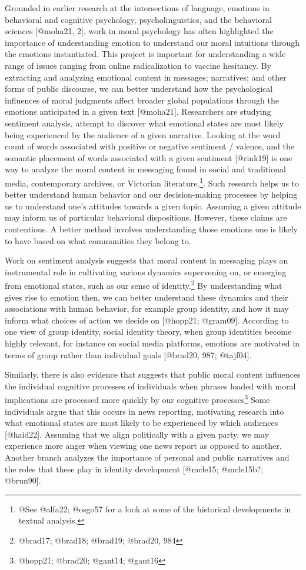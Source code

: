 \documentclass[
  letterpaper,
  DIV=11,
  numbers=noendperiod]{scrartcl}
\theoremstyle{remark}
\begin{document}
Grounded in earlier research at the intersections of language, emotions
in behavioral and cognitive psychology, psycholinguistics, and the
behavioral sciences {[}@moha21, 2{]}, work in moral psychology has often
highlighted the importance of understanding emotion to understand our
moral intuitions through the emotions instantiated. This project is
important for understanding a wide range of issues ranging from online
radicalization to vaccine hesitancy. By extracting and analyzing
emotional content in messages; narratives; and other forms of public
discourse, we can better understand how the psychological influences of
moral judgments affect broader global populations through the emotions
anticipated in a given text {[}@moha21{]}. Researchers are studying
sentiment analysis, attempt to discover what emotional states are most
likely being experienced by the audience of a given narrative. Looking
at the word count of words associated with positive or negative
sentiment / valence, and the semantic placement of words associated with
a given sentiment {[}@rink19{]} is one way to analyze the moral content
in messaging found in social and traditional media, contemporary
archives, or Victorian literature.\footnote{@See @alfa22; @osgo57 for a
  look at some of the historical developments in textual analysis.}.
Such research helps us to better understand human behavior and our
decision-making processes by helping us to understand one's attitudes
towards a given topic. Assuming a given attitude may inform us of
particular behavioral dispositions. However, these claims are
contentious. A better method involves understanding those emotions one
is likely to have based on what communities they belong to.

Work on sentiment analysis suggests that moral content in messaging
plays an instrumental role in cultivating various dynamics supervening
on, or emerging from emotional states, such as our sense of
identity.\footnote{@brad17; @brad18; @brad19; @brad20, 984} By
understanding what gives rise to emotion then, we can better understand
these dynamics and their associations with human behavior, for example
group identity, and how it may inform what choices of action we decide
on {[}@hopp21; @gram09{]}. According to one view of group identity,
social identity theory, when group identities become highly relevant,
for instance on social media platforms, emotions are motivated in terms
of group rather than individual goals {[}@brad20, 987; @tajf04{]}.

Similarly, there is also evidence that suggests that public moral
content influences the individual cognitive processes of individuals
when phrases loaded with moral implications are processed more quickly
by our cognitive processes\footnote{@hopp21; @brad20; @gant14; @gant16}
Some individuals argue that this occurs in news reporting, motivating
research into what emotional states are most likely to be experienced by
which audiences {[}@haid22{]}. Assuming that we align politically with a
given party, we may experience more anger when viewing one news report
as opposed to another. Another branch analyzes the importance of
personal and public narratives and the roles that these play in identity
development {[}@mcle15; @mcle15b?; @brun90{]}.
\end{document}
